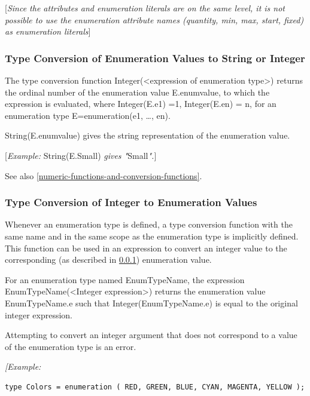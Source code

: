 \documentclass[10pt,a4paper]{report}
\def\doublelabel#1{\label{#1}}
\begin{document}
{[}\emph{Since the attributes and enumeration literals are on the same
level, it is not possible to use the enumeration attribute names
(quantity, min, max, start, fixed) as enumeration literals}{]}

\subsubsection{Type Conversion of Enumeration Values to String or Integer}\doublelabel{type-conversion-of-enumeration-values-to-string-or-integer}

The type conversion function Integer(\textless{}expression of
enumeration type\textgreater{}) returns the ordinal number of the
enumeration value E.enumvalue, to which the expression is evaluated,
where Integer(E.e1) =1, Integer(E.en) = n, for an enumeration type
E=enumeration(e1, \ldots{}, en).

String(E.enumvalue) gives the string representation of the enumeration
value. 

{[}\emph{Example:} String(E.Small) \emph{gives
"}Small\emph{".}{]}

See also \ref{numeric-functions-and-conversion-functions}.

\subsubsection{Type Conversion of Integer to Enumeration Values}\doublelabel{type-conversion-of-integer-to-enumeration-values}

Whenever an enumeration type is defined, a type conversion function with
the same name and in the same scope as the enumeration type is
implicitly defined. This function can be used in an expression to
convert an integer value to the corresponding (as described in \ref{type-conversion-of-enumeration-values-to-string-or-integer}) enumeration value.

For an enumeration type named EnumTypeName, the expression
EnumTypeName(\textless{}Integer expression\textgreater{}) returns the
enumeration value EnumTypeName.e such that Integer(EnumTypeName.e) is
equal to the original integer expression.

Attempting to convert an integer argument that does not correspond to a
value of the enumeration type is an error.

\emph{{[}Example: }
\begin{lstlisting}[language=Modelica]
type Colors = enumeration ( RED, GREEN, BLUE, CYAN, MAGENTA, YELLOW );
\end{lstlisting}
\end{document}
